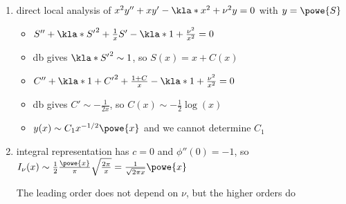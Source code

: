 \documentclass[english, parskip=full]{scrbook}
\newcommand{\note}[1]{\begin{tcolorbox}[colback=colorbackgroundnote,colframe=colornote, breakable,enhanced]#1\end{tcolorbox}}
\newcommand{\example}[3]{\begin{tcolorbox}[colback=colorbackgroundexample,colframe=colorexample, breakable,enhanced,title={\textbf{#1}: #2.}]#3\end{tcolorbox}}
\begin{document}
\example{Modified Bessel function of first kind}{$I_\nu(x) = \frac{1}{\pi} \intx{0}{\pi}{\powe{x\cos(t)} \cos(\nu t)}{t}$ as $x\rightarrow\infty$}{\begin{enumerate}
\item direct local analysis of $x^2 y''+xy'-\kla*{x^2+\nu^2}y=0$ with $y=\powe{S}$
\begin{itemize}
\item $S'' + \kla*{S'}^2 + \frac{1}{x} S' - \kla*{1 + \frac{\nu^2}{x^2}} = 0$
\item \gls{db} gives $\kla*{S'}^2 \sim 1$, so $S(x) = x+C(x)$
\item $C'' + \kla*{1 + C'}^2 + \frac{1+C}{x} - \kla*{1 + \frac{\nu^2}{x^2}} = 0$
\item \gls{db} gives $C' \sim -\frac{1}{2x}$, so $C(x) \sim -\frac{1}{2} \log(x)$
\item $y(x) \sim C_1 x^{-1/2} \powe{x}$ and we cannot determine $C_1$
\end{itemize}
\item integral representation has $c=0$ and $\phi''(0)=-1$, so $I_\nu(x) \sim \frac{1}{2} \frac{\powe{x}}{\pi} \sqrt{\frac{2\pi}{x}} = \frac{1}{\sqrt{2\pi x}} \powe{x}$
\note{The leading order does not depend on $\nu$, but the higher orders do}
\end{enumerate}
}
\end{document}
